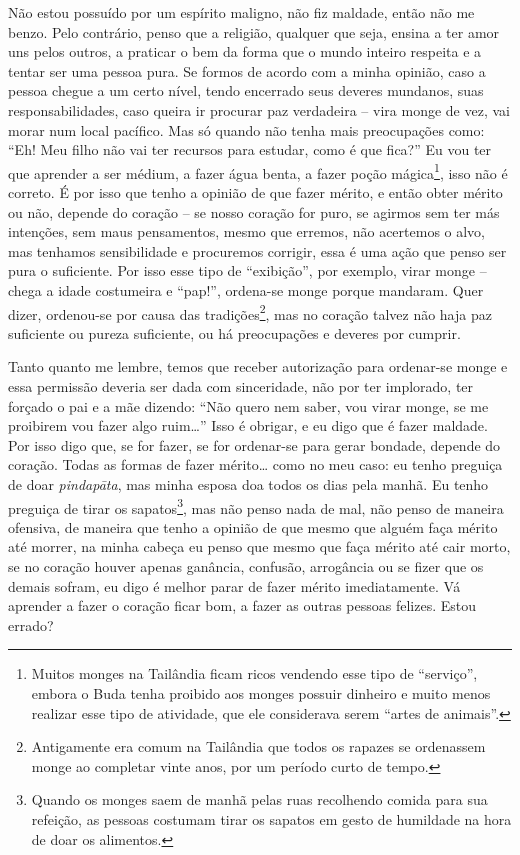 Não estou possuído por um espírito maligno, não fiz maldade, então
não me benzo. Pelo contrário, penso que a religião, qualquer que seja,
ensina a ter amor uns pelos outros, a praticar o bem da forma que o
mundo inteiro respeita e a tentar ser uma pessoa pura. Se formos de
acordo com a minha opinião, caso a pessoa chegue a um certo nível,
tendo encerrado seus deveres mundanos, suas responsabilidades, caso
queira ir procurar paz verdadeira – vira monge de vez, vai morar num
local pacífico. Mas só quando não tenha mais preocupações como: “Eh!
Meu filho não vai ter recursos para estudar, como é que fica?” Eu vou
ter que aprender a ser médium, a fazer água benta, a fazer poção
mágica\footnote{Muitos monges na Tailândia ficam ricos vendendo esse
tipo de “serviço”, embora o Buda tenha proibido aos monges possuir
dinheiro e muito menos realizar esse tipo de atividade, que ele
considerava serem “artes de animais”. }, isso não é correto. É por isso
que tenho a opinião de que fazer mérito, e então obter mérito ou não,
depende do coração – se nosso coração for puro, se agirmos sem ter más
intenções, sem maus pensamentos, mesmo que erremos, não acertemos o
alvo, mas tenhamos sensibilidade e procuremos corrigir, essa é uma ação
que penso ser pura o suficiente. Por isso esse tipo de “exibição”, por
exemplo, virar monge – chega a idade costumeira e “pap!”, ordena-se
monge porque mandaram. Quer dizer, ordenou-se por causa das
tradições\footnote{Antigamente era comum na Tailândia que todos os
rapazes se ordenassem monge ao completar vinte anos, por um período
curto de tempo.}, mas no coração talvez não haja paz suficiente ou
pureza suficiente, ou há preocupações e deveres por cumprir. 

Tanto quanto me lembre, temos que receber autorização para
ordenar-se monge e essa permissão deveria ser dada com sinceridade, não
por ter implorado, ter forçado o pai e a mãe dizendo: “Não quero nem
saber, vou virar monge, se me proibirem vou fazer algo ruim…” Isso é
obrigar, e eu digo que é fazer maldade. Por isso digo que, se for
fazer, se for ordenar-se para gerar bondade, depende do coração. Todas
as formas de fazer mérito… como no meu caso: eu tenho preguiça de doar
\textit{pindapāta}, mas minha esposa doa todos os dias pela manhã. Eu
tenho preguiça de tirar os sapatos\footnote{Quando os monges saem de
manhã pelas ruas recolhendo comida para sua refeição, as pessoas
costumam tirar os sapatos em gesto de humildade na hora de doar os
alimentos.}, mas não penso nada de mal, não penso de maneira ofensiva,
de maneira que tenho a opinião de que mesmo que alguém faça mérito até
morrer, na minha cabeça eu penso que mesmo que faça mérito até cair
morto, se no coração houver apenas ganância, confusão, arrogância ou se
fizer que os demais sofram, eu digo é melhor parar de fazer mérito
imediatamente. Vá aprender a fazer o coração ficar bom, a fazer as
outras pessoas felizes. Estou errado?

